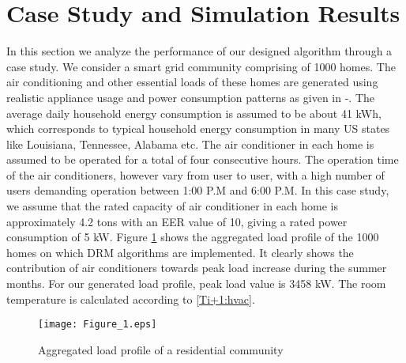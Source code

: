 \documentclass[10pt,twocolumn,twoside]{IEEEtran}
\begin{document}
\section{Case Study and Simulation Results}
In this section we analyze the performance of our designed algorithm through a case study. We consider a smart grid community comprising of 1000 homes. The air conditioning and other essential loads of these homes are generated using realistic appliance usage and power consumption patterns as given in \cite{energy1}-\cite{energy_pattern}. The average daily household energy consumption is assumed to be about 41 kWh, which corresponds to typical household energy consumption in many US states like Louisiana, Tennessee, Alabama etc. The air conditioner in each home is assumed to be operated for a total of four consecutive hours. The operation time of the air conditioners, however vary from user to user, with a high number of users demanding operation between 1:00 P.M and 6:00 P.M. In this case study, we assume that the rated capacity of air conditioner in each home is approximately 4.2 tons with an EER value of 10, giving a rated power consumption of 5 kW. Figure \ref{fig:fig001} shows the aggregated load profile of the 1000 homes on which DRM algorithms are implemented. It clearly shows the contribution of air conditioners towards peak load increase during the summer months. For our generated load profile, peak load value is 3458 kW. The room temperature is calculated according to \eqref{Ti+1:hvac}. 

\begin{figure}[htb]
\centering
\texttt{[image: Figure\_1.eps]}
\caption{Aggregated load profile of a residential community}
\label{fig:fig001}
\end{figure}
\end{document}
